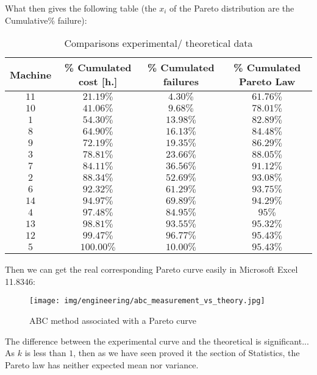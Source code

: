 	What then gives the following table (the $x_i$ of the Pareto distribution are the Cumulative\% failure):
	\begin{table}[H]\centering
	\begin{center}
			\begin{tabular}{|c|c|c|c|}
				\hline
				\multicolumn{1}{c}{\cellcolor{black!30}\textbf{Machine}} & 
  \multicolumn{1}{c}{\cellcolor{black!30}\textbf{\% Cumulated cost [h.]}} & 
  \multicolumn{1}{c}{\cellcolor{black!30}\textbf{\% Cumulated failures}} & 
  \multicolumn{1}{c}{\cellcolor{black!30}\textbf{\% Cumulated Pareto Law}} \\ \hline
				 $11$ & $21.19\%$ & $4.30\%$ & $61.76\%$\\ \hline
				$10$ & $41.06\%$ & $9.68\%$ & $78.01\%$\\ \hline
				$1$ & $54.30\%$ & $13.98\%$ & $82.89\%$\\ \hline
				$8$ & $64.90\%$ & $16.13\%$ & $84.48\%$\\ \hline
				$9$ & $72.19\%$ & $19.35\%$ & $86.29\%$\\ \hline
				$3$ & $78.81\%$ & $23.66\%$ & $88.05\%$\\ \hline
				$7$ & $84.11\%$ & $36.56\%$ & $91.12\%$\\ \hline
				$2$ & $88.34\%$ & $52.69\%$ & $93.08\%$\\ \hline
				$6$ & $92.32\%$ & $61.29\%$ & $93.75\%$\\ \hline
				$14$ & $94.97\%$ & $69.89\%$ & $94.29\%$\\ \hline
				$4$ & $97.48\%$ & $84.95\%$ & $95\%$\\ \hline
				$13$ & $98.81\%$ & $93.55\%$ & $95.32\%$\\ \hline
				$12$ & $99.47\%$ & $96.77\%$ & $95.43\%$\\ \hline
				$5$ & $100.00\%$ & $10.00\%$ & $95.43\%$\\ \hline
		\end{tabular}
	\end{center}
	\caption[]{Comparisons experimental/ theoretical data }
	\end{table}
	Then we can get the real corresponding Pareto curve easily in Microsoft Excel 11.8346:
	\begin{figure}[H]
		\begin{center}
		\texttt{[image: img/engineering/abc\_measurement\_vs\_theory.jpg]}
		\end{center}	
		\caption{ABC method associated with a Pareto curve}
	\end{figure}
	The difference between the experimental curve and the theoretical is significant... As $k$ is less than $1$, then as we have seen proved it the section of Statistics, the Pareto law has neither expected mean nor variance.
	

